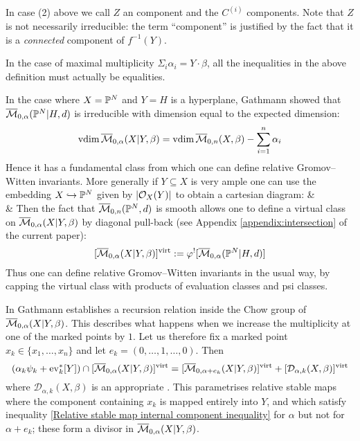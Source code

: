 \begin{remark}In case (2) above we call $Z$ an  component and the $C^{(i)}$  components. Note that $Z$ is not necessarily irreducible: the term ``component'' is justified by the fact that it is a \emph{connected} component of $f^{-1}(Y)$. \end{remark}

\begin{remark} In the case of maximal multiplicity $\Sigma_{i} \alpha_i = Y \cdot \beta$, all the inequalities in the above definition must actually be equalities. \end{remark}

In the case where $X=\mathbb P^N$ and $Y=H$ is a hyperplane, Gathmann showed that $\overline{\mathcal M}_{0,\alpha}(\mathbb P^N|H,d)$ is irreducible with dimension equal to the expected dimension:
\begin{equation*} \operatorname{vdim} \overline{\mathcal M}_{0,\alpha}(X|Y,\beta) = \operatorname{vdim}{\overline{\mathcal M}_{0,n}(X,\beta)} - \sum_{i=1}^n \alpha_i \end{equation*}
Hence it has a fundamental class from which one can define relative Gromov--Witten invariants.
More generally if $Y \subseteq X$ is very ample one can use the embedding $X \hookrightarrow \mathbb P^N$ given by $|\mathcal{O}_X(Y)|$ to obtain a cartesian diagram:
\bcd
{} \ar[r] \ar[d]  &  \ar[d] \\
 \ar[r,"\varphi"] & 
\ecd
Then the fact that $\overline{\mathcal M}_{0,n}(\mathbb P^N,d)$ is smooth allows one to define a virtual class on $\overline{\mathcal M}_{0,\alpha}(X|Y,\beta)$ by diagonal pull-back (see Appendix \ref{appendix:intersection} of the current paper):
\begin{equation*} [\overline{\mathcal M}_{0,\alpha}(X|Y,\beta)]^{\operatorname{virt}} := \varphi^! [\overline{\mathcal M}_{0,\alpha}(\mathbb P^N|H,d)] \end{equation*}
Thus one can define relative Gromov--Witten invariants in the usual way, by capping the virtual class with products of evaluation classes and psi classes.

In \cite[\S\S 2-4]{Ga} Gathmann establishes a recursion relation inside the Chow group of $\overline{\mathcal M}_{0,\alpha}(X|Y,\beta)$. This describes what happens when we increase the multiplicity at one of the marked points by $1$. Let us therefore fix a marked point $x_k \in \{ x_1, \ldots, x_n \}$ and let $e_k = (0,\ldots,1,\ldots,0)$. Then
\begin{equation*} (\alpha_k \psi_k + \operatorname{ev}_k^* [Y]) \cap [\overline{\mathcal M}_{0,\alpha}(X|Y,\beta)]^{\operatorname{virt}} = [\overline{\mathcal M}_{0,\alpha+e_k}(X|Y,\beta)]^{\operatorname{virt}} + [\mathcal{D}_{\alpha,k}(X,\beta)]^{\operatorname{virt}} \end{equation*}
where $\mathcal{D}_{\alpha,k}(X,\beta)$ is an appropriate . This parametrises relative stable maps where the component containing $x_k$ is mapped entirely into $Y$, and which satisfy inequality \eqref{Relative stable map internal component inequality} for $\alpha$ but not for $\alpha+e_k$; these form a divisor in $\overline{\mathcal M}_{0,\alpha}(X|Y,\beta)$.


